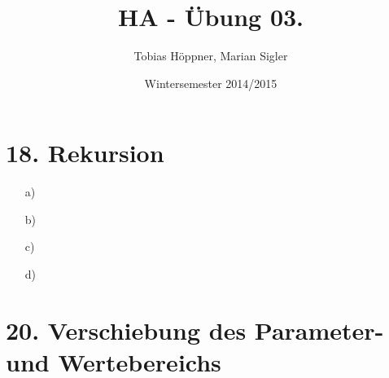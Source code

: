\documentclass[ngerman,a4paper]{report}
\author{Tobias Höppner, Marian Sigler}
\title{HA - Übung 03. }
\date{Wintersemester 2014/2015}
\renewcommand{\maketitle}{}
\begin{document}
 
\maketitle 
\section*{18. Rekursion}
\begin{enumerate}
\item[a)] 
\item[b)]
\item[c)]
\item[d)]
\end{enumerate}
\section*{20. Verschiebung des Parameter- und Wertebereichs}
\end{document}
